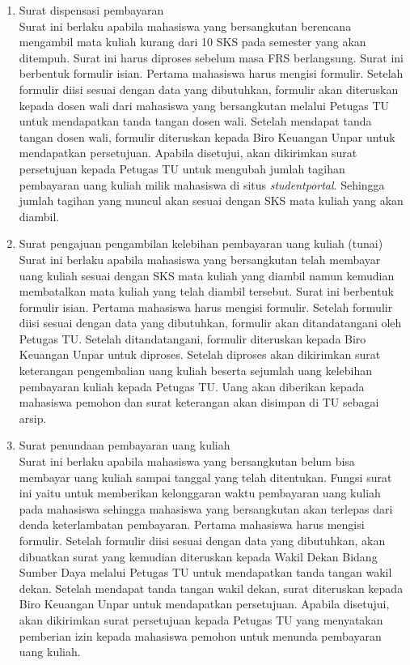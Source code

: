 \begin{enumerate}
	\item Surat dispensasi pembayaran \\
	Surat ini berlaku apabila mahasiswa yang bersangkutan berencana mengambil mata kuliah kurang dari 10 SKS pada semester yang akan ditempuh. Surat ini harus diproses sebelum masa FRS berlangsung. Surat ini berbentuk formulir isian. Pertama mahasiswa harus mengisi formulir. Setelah formulir diisi sesuai dengan data yang dibutuhkan, formulir akan diteruskan kepada dosen wali dari mahasiswa yang bersangkutan melalui Petugas TU untuk mendapatkan tanda tangan dosen wali. Setelah mendapat tanda tangan dosen wali, formulir diteruskan kepada Biro Keuangan Unpar untuk mendapatkan persetujuan. Apabila disetujui, akan dikirimkan surat persetujuan kepada Petugas TU untuk mengubah jumlah tagihan pembayaran uang kuliah milik mahasiswa di situs \textit{studentportal}. Sehingga jumlah tagihan yang muncul akan sesuai dengan SKS mata kuliah yang akan diambil. 
	
	\item Surat pengajuan pengambilan kelebihan pembayaran uang kuliah (tunai) \\
	Surat ini berlaku apabila mahasiswa yang bersangkutan telah membayar uang kuliah sesuai dengan SKS mata kuliah yang diambil namun kemudian membatalkan mata kuliah yang telah diambil tersebut. Surat ini berbentuk formulir isian. Pertama mahasiswa harus mengisi formulir. Setelah formulir diisi sesuai dengan data yang dibutuhkan, formulir akan ditandatangani oleh Petugas TU. Setelah ditandatangani, formulir diteruskan kepada Biro Keuangan Unpar untuk diproses. Setelah diproses akan dikirimkan surat keterangan pengembalian uang kuliah beserta sejumlah uang kelebihan pembayaran kuliah kepada Petugas TU. Uang akan diberikan kepada mahasiswa pemohon dan surat keterangan akan disimpan di TU sebagai arsip.

	\item Surat penundaan pembayaran uang kuliah \\
	Surat ini berlaku apabila mahasiswa yang bersangkutan belum bisa membayar uang kuliah sampai tanggal yang telah ditentukan. Fungsi surat ini yaitu untuk memberikan kelonggaran waktu pembayaran uang kuliah pada mahasiswa sehingga mahasiswa yang bersangkutan akan terlepas dari denda keterlambatan pembayaran. Pertama mahasiswa harus mengisi formulir. Setelah formulir diisi sesuai dengan data yang dibutuhkan, akan dibuatkan surat yang kemudian diteruskan kepada Wakil Dekan Bidang Sumber Daya melalui Petugas TU untuk mendapatkan tanda tangan wakil dekan. Setelah mendapat tanda tangan wakil dekan, surat diteruskan kepada Biro Keuangan Unpar untuk mendapatkan persetujuan. Apabila disetujui, akan dikirimkan surat persetujuan kepada Petugas TU yang menyatakan pemberian izin kepada mahasiswa pemohon untuk menunda pembayaran uang kuliah.
	

\end{enumerate}
